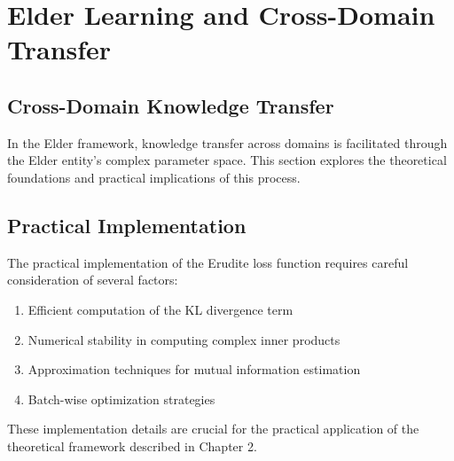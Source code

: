 \chapter{Elder Learning and Cross-Domain Transfer}

\section{Cross-Domain Knowledge Transfer}

In the Elder framework, knowledge transfer across domains is facilitated through the Elder entity's complex parameter space. This section explores the theoretical foundations and practical implications of this process.

\section{Practical Implementation}

The practical implementation of the Erudite loss function requires careful consideration of several factors:

\begin{enumerate}
    \item Efficient computation of the KL divergence term
    \item Numerical stability in computing complex inner products
    \item Approximation techniques for mutual information estimation
    \item Batch-wise optimization strategies
\end{enumerate}

These implementation details are crucial for the practical application of the theoretical framework described in Chapter 2.